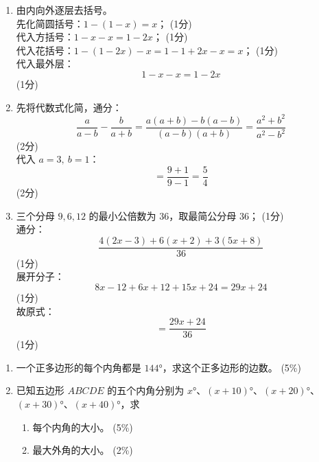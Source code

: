 \documentclass[12pt,a4paper]{exam-zh}
\begin{document}
\begin{solution}
    \begin{enumerate}[label=(\alph*)]
        \item 由内向外逐层去括号。\\
        先化简圆括号：$1-(1-x) = x$； \hfill (1分) \\
        代入方括号：$1-x-x = 1-2x$； \hfill (1分) \\
        代入花括号：$1-(1-2x)-x = 1-1+2x-x = x$； \hfill (1分) \\
        代入最外层：
        $$1-x-x = 1-2x$$ \hfill (1分)

        \item 先将代数式化简，通分：
        $$\frac{a}{a-b}-\frac{b}{a+b} = \frac{a(a+b)-b(a-b)}{(a-b)(a+b)} = \frac{a^2+b^2}{a^2-b^2}$$ \hfill (2分) \\
        代入 $a=3,\ b=1$：
        $$= \frac{9+1}{9-1} = \frac{5}{4}$$ \hfill (2分)

        \item 三个分母 $9,6,12$ 的最小公倍数为 $36$，取最简公分母 $36$； \hfill (1分) \\
        通分：
        $$\frac{4(2x-3)+6(x+2)+3(5x+8)}{36}$$ \hfill (1分) \\
        展开分子：
        $$8x-12+6x+12+15x+24 = 29x+24$$ \hfill (1分) \\
        故原式：
        $$= \frac{29x+24}{36}$$ \hfill (1分)
    \end{enumerate}
\end{solution}


\begin{question}[points = 18]
    \begin{enumerate}[label=(\alph*)]
        \item 一个正多边形的每个内角都是 $144°$，求这个正多边形的边数。 \hfill (5\%)
        \item 已知五边形 $ABCDE$ 的五个内角分别为 $x°$、$(x+10)°$、$(x+20)°$、$(x+30)°$、$(x+40)°$，求
        \begin{enumerate}[label=(\roman*)]
            \item 每个内角的大小。 \hfill (5\%)
            \item 最大外角的大小。 \hfill (2\%)
        \end{enumerate}
    \end{enumerate}
\end{question}
\end{document}
